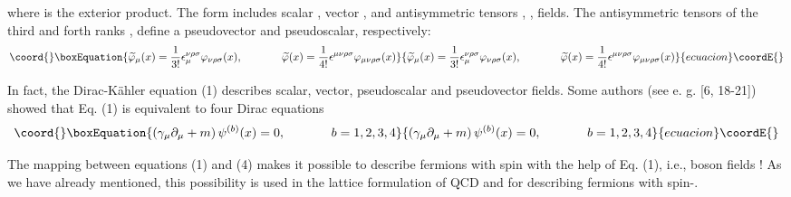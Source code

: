 \documentclass[a4paper,12pt]{article}
\begin{document}
where \myHighlight{$\wedge $}\coordHE{} is the exterior product. The form \myHighlight{$\Phi $}\coordHE{} includes
scalar \coordHE{}, vector \coordHE{}, and
antisymmetric tensors \coordHE{}, \coordHE{}, \coordHE{} fields. The
antisymmetric tensors of the third and forth ranks \coordHE{}, \coordHE{} define a
pseudovector and pseudoscalar, respectively:
\begin{equation}\coord{}\boxEquation{
\widetilde{\varphi }_\mu (x)=\frac 1{3!}\epsilon _\mu ^{\nu \rho \sigma
}\varphi _{\nu \rho \sigma }(x),\hspace{0.5in}\widetilde{\varphi }(x)=\frac
1{4!}\epsilon ^{\mu \nu \rho \sigma }\varphi _{\mu \nu \rho \sigma }(x)
\label{3}
}{
\widetilde{\varphi }_\mu (x)=\frac 1{3!}\epsilon _\mu ^{\nu \rho \sigma
}\varphi _{\nu \rho \sigma }(x),\hspace{0.5in}\widetilde{\varphi }(x)=\frac
1{4!}\epsilon ^{\mu \nu \rho \sigma }\varphi _{\mu \nu \rho \sigma }(x)
}{ecuacion}\coordE{}\end{equation}

In fact, the Dirac-K\"ahler equation (1) describes scalar, vector,
pseudoscalar and pseudovector fields. Some authors (see e. g. [6, 18-21])
showed that Eq. (1) is equivalent to four Dirac equations
\begin{equation}\coord{}\boxEquation{
\left( \gamma _\mu \partial _\mu +m\right) \psi
^{(b)}(x)=0,\hspace{0.5in} b=1,2,3,4 \label{4}
}{
\left( \gamma _\mu \partial _\mu +m\right) \psi
^{(b)}(x)=0,\hspace{0.5in} b=1,2,3,4 }{ecuacion}\coordE{}\end{equation}

The mapping between equations (1) and (4) makes it possible to describe
fermions with spin \coordHE{} with the help of Eq. (1), i.e., boson fields ! As
we have already mentioned, this possibility is used in the lattice
formulation of QCD and for describing fermions with spin-\coordHE{}.
\end{document}
